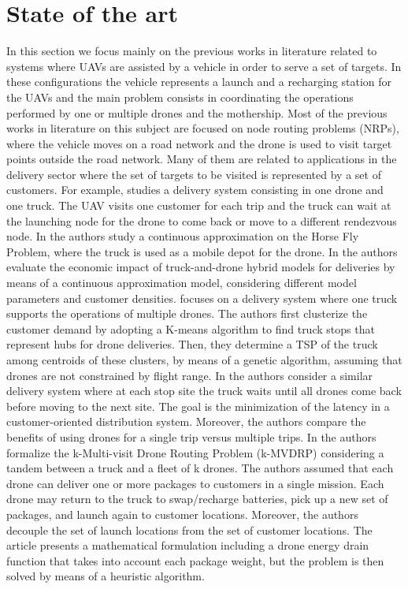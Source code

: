 \section{State of the art}
\noindent
In this section we focus mainly on the previous works in literature related to systems where UAVs are assisted by a vehicle in order to serve a set of targets.
In these configurations the vehicle represents a launch and a recharging station for the UAVs and the main problem consists in coordinating the operations performed by one or multiple drones and the mothership.
Most of the previous works in literature on this subject are focused on node routing problems (NRPs), where the vehicle moves on a road network and the drone is used to visit target points outside the road network. 
Many of them are related to applications in the delivery sector where the set of targets to be visited is represented by a set of customers.
For example, \cite{art:Mathew2015} studies a delivery system consisting in one drone and one truck. The UAV visits one customer for each trip and the truck can wait at the launching node for the drone to come back or move to a different rendezvous node. In \cite{art:Carlsson2018} the authors study a continuous approximation on the Horse Fly Problem, where the truck is used as a mobile depot for the drone. In \cite{art:Campbell2017} the authors evaluate the economic impact of truck-and-drone hybrid models for deliveries by means of a continuous approximation model, considering different model parameters and customer densities. \cite{art:Ferrandez2016} focuses on a delivery system where one truck supports the operations of multiple drones. The authors first clusterize the customer demand by adopting a K-means algorithm to find truck stops that represent hubs for drone deliveries. Then, they determine a TSP of the truck among centroids of these clusters, by means of a genetic algorithm, assuming that drones are not constrained by flight range. In \cite{art:Moshref2017} the authors consider a similar delivery system where at each stop site the truck waits until all drones come back before moving to the next site. The goal is the minimization of the latency in a customer-oriented distribution system. Moreover, the authors compare the benefits of using drones for a single trip versus multiple trips. In \cite{art:Poikonen2020} the authors formalize the k-Multi-visit Drone Routing Problem (k-MVDRP) considering a tandem between a truck and a fleet of k drones. The authors assumed that each drone can deliver one or more packages to customers in a single mission. Each drone may return to the truck to swap/recharge batteries, pick up a new set of packages, and launch again to customer locations. Moreover, the authors decouple the set of launch locations from the set of customer locations. The article presents a mathematical formulation including a drone energy drain function that takes into account each package weight, but the problem is then solved by means of a heuristic algorithm.
